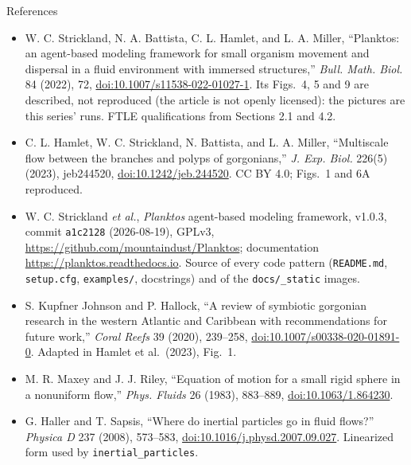 \documentclass[aspectratio=169,11pt]{beamer}
\begin{document}
\begin{frame}{References}
\footnotesize
\begin{itemize}\itemsep3pt
  \item W. C. Strickland, N. A. Battista, C. L. Hamlet, and L. A. Miller, ``Planktos: an agent-based modeling framework for small organism movement and dispersal in a fluid environment with immersed structures,'' \emph{Bull. Math. Biol.} 84 (2022), 72, \href{https://doi.org/10.1007/s11538-022-01027-1}{doi:10.1007/s11538-022-01027-1}. Its Figs.~4, 5 and 9 are described, not reproduced (the article is not openly licensed): the pictures are this series' runs. FTLE qualifications from Sections 2.1 and 4.2.
  \item C. L. Hamlet, W. C. Strickland, N. Battista, and L. A. Miller, ``Multiscale flow between the branches and polyps of gorgonians,'' \emph{J. Exp. Biol.} 226(5) (2023), jeb244520, \href{https://doi.org/10.1242/jeb.244520}{doi:10.1242/jeb.244520}. CC BY 4.0; Figs.~1 and 6A reproduced.
  \item W. C. Strickland \emph{et al.}, \emph{Planktos} agent-based modeling framework, v1.0.3, commit \texttt{a1c2128} (2026-08-19), GPLv3, \url{https://github.com/mountaindust/Planktos}; documentation \url{https://planktos.readthedocs.io}. Source of every code pattern (\texttt{README.md}, \texttt{setup.cfg}, \texttt{examples/}, docstrings) and of the \texttt{docs/\_static} images.
  \item S. Kupfner Johnson and P. Hallock, ``A review of symbiotic gorgonian research in the western Atlantic and Caribbean with recommendations for future work,'' \emph{Coral Reefs} 39 (2020), 239--258, \href{https://doi.org/10.1007/s00338-020-01891-0}{doi:10.1007/s00338-020-01891-0}. Adapted in Hamlet et al.\ (2023), Fig.~1.
  \item M. R. Maxey and J. J. Riley, ``Equation of motion for a small rigid sphere in a nonuniform flow,'' \emph{Phys. Fluids} 26 (1983), 883--889, \href{https://doi.org/10.1063/1.864230}{doi:10.1063/1.864230}.
  \item G. Haller and T. Sapsis, ``Where do inertial particles go in fluid flows?'' \emph{Physica D} 237 (2008), 573--583, \href{https://doi.org/10.1016/j.physd.2007.09.027}{doi:10.1016/j.physd.2007.09.027}. Linearized form used by \texttt{inertial\_particles}.
\end{itemize}
\end{frame}
\end{document}
